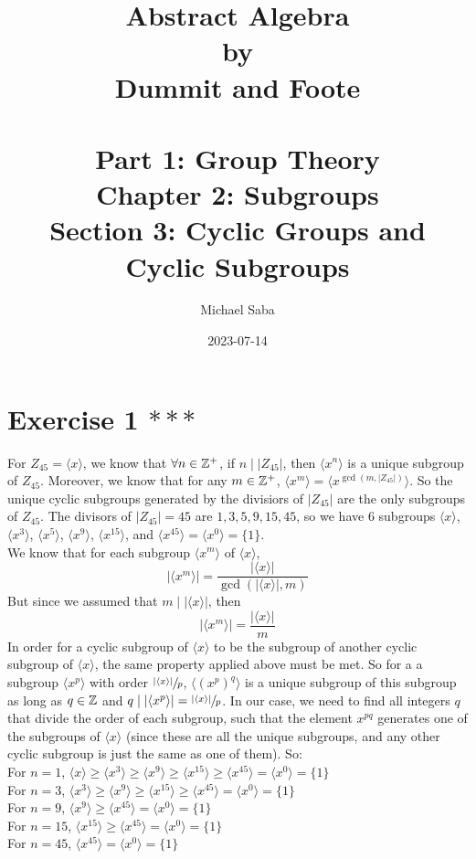\documentclass[12pt]{article}
\title{%
    \Huge Abstract Algebra \\
    \large by \\
    \Large Dummit and Foote \\~\\
    \huge Part 1: Group Theory \\
    \LARGE Chapter 2: Subgroups \\
    \Large Section 3: Cyclic Groups and Cyclic Subgroups
}
\date{2023-07-14}
\author{Michael Saba}
\begin{document}
    \maketitle
    \newpage
    \setlength{\parindent}{0pt}

    \section*{Exercise 1 $***$}
    For $Z_{45} = \langle x \rangle$,
    we know that $\forall n \in \mathbb{Z}^+$,
    if $n \mid |Z_{45}|$,
    then $\langle x^n \rangle$ is a unique subgroup of $Z_{45}$.
    Moreover, we know that for any $m \in \mathbb{Z}^+$,
    $\langle x^m \rangle = \langle x^{\gcd(m, |Z_{45}|)} \rangle$.
    So the unique cyclic subgroups generated by the divisiors of $|Z_45|$
    are the only subgroups of $Z_{45}$.
    The divisors of $|Z_{45}| = 45$ are $1, 3, 5, 9, 15, 45$,
    so we have 6 subgroups $\langle x \rangle$, 
    $\langle x^3 \rangle$, $\langle x^5 \rangle$,
    $\langle x^9 \rangle$, $\langle x^{15} \rangle$,
    and $\langle x^{45} \rangle = \langle x^0 \rangle = \{1\}$. \\
    We know that for each subgroup
    $\langle x^m \rangle$ of $\langle x \rangle$,
    \[ |\langle x^m \rangle|
    = \dfrac{|\langle x \rangle|}{\gcd(|\langle x \rangle|, m)} \]
    But since we assumed that $m \mid |\langle x \rangle|$,
    then 
    \[ |\langle x^m \rangle|
    = \dfrac{|\langle x \rangle|}{m} \]
    In order for a cyclic subgroup of $\langle x \rangle$
    to be the subgroup of another cyclic subgroup of $\langle x \rangle$,
    the same property applied above must be met.
    So for a a subgroup $\langle x^p \rangle$ with order 
    $\sfrac{|\langle x \rangle|}{p}$,
    $\langle (x^p)^q \rangle$ is a unique subgroup of this subgroup
    as long as $q \in \mathbb{Z}$ and $q \mid |\langle x^p \rangle|
    = \sfrac{|\langle x \rangle|}{p}$.
    In our case, we need to find all integers $q$
    that divide the order of each subgroup,
    such that the element $x^{pq}$ generates one of the subgroups
    of $\langle x \rangle$
    (since these are all the unique subgroups, and any other cyclic
    subgroup is just the same as one of them).
    So: \\
    For $n = 1$, $\langle x \rangle
    \geqslant \langle x^3 \rangle 
    \geqslant \langle x^9 \rangle
    \geqslant \langle x^{15} \rangle
    \geqslant \langle x^{45} \rangle = \langle x^0 \rangle = \{1\}$ \\
    For $n = 3$, $\langle x^3 \rangle 
    \geqslant \langle x^9 \rangle
    \geqslant \langle x^{15} \rangle
    \geqslant \langle x^{45} \rangle = \langle x^0 \rangle = \{1\}$ \\
    For $n = 9$, $\langle x^9 \rangle
    \geqslant \langle x^{45} \rangle = \langle x^0 \rangle = \{1\}$ \\
    For $n = 15$, $\langle x^{15} \rangle
    \geqslant \langle x^{45} \rangle = \langle x^0 \rangle = \{1\}$ \\
    For $n = 45$, $\langle x^{45} \rangle = \langle x^0 \rangle = \{1\}$ \\
\end{document}
